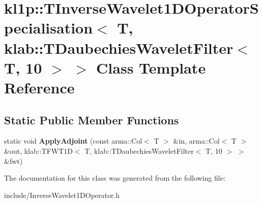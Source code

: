 \hypertarget{classkl1p_1_1TInverseWavelet1DOperatorSpecialisation_3_01T_00_01klab_1_1TDaubechiesWaveletFilter_3_01T_00_0110_01_4_01_4}{}\section{kl1p\+:\+:T\+Inverse\+Wavelet1\+D\+Operator\+Specialisation$<$ T, klab\+:\+:T\+Daubechies\+Wavelet\+Filter$<$ T, 10 $>$ $>$ Class Template Reference}
\label{classkl1p_1_1TInverseWavelet1DOperatorSpecialisation_3_01T_00_01klab_1_1TDaubechiesWaveletFilter_3_01T_00_0110_01_4_01_4}
\subsection*{Static Public Member Functions}
\begin{DoxyCompactItemize}
\item 
static void {\bfseries Apply\+Adjoint} (const arma\+::\+Col$<$ T $>$ \&in, arma\+::\+Col$<$ T $>$ \&out, klab\+::\+T\+F\+W\+T1D$<$ T, klab\+::\+T\+Daubechies\+Wavelet\+Filter$<$ T, 10 $>$ $>$ \&fwt)\hypertarget{classkl1p_1_1TInverseWavelet1DOperatorSpecialisation_3_01T_00_01klab_1_1TDaubechiesWaveletFilter_3_01T_00_0110_01_4_01_4_abf5847bdc6206fd65acd218bb8f68d8d}{}\label{classkl1p_1_1TInverseWavelet1DOperatorSpecialisation_3_01T_00_01klab_1_1TDaubechiesWaveletFilter_3_01T_00_0110_01_4_01_4_abf5847bdc6206fd65acd218bb8f68d8d}

\end{DoxyCompactItemize}


The documentation for this class was generated from the following file\+:\begin{DoxyCompactItemize}
\item 
include/Inverse\+Wavelet1\+D\+Operator.\+h\end{DoxyCompactItemize}

